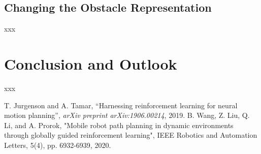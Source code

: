 \documentclass[conference]{IEEEtran}
\begin{document}
\subsection{Changing the Obstacle Representation}

xxx

\section{Conclusion and Outlook} 

xxx

\begin{thebibliography}{00}
 T. Jurgenson and A. Tamar, ``Harnessing reinforcement learning for neural
motion planning'',  \textit{arXiv preprint arXiv:1906.00214}, 2019.
 B. Wang, Z. Liu, Q. Li, and A. Prorok, "Mobile robot path planning in dynamic environments through globally guided reinforcement learning",  IEEE Robotics and Automation Letters, 5(4), pp. 6932-6939, 2020.
\end{thebibliography}
\end{document}
